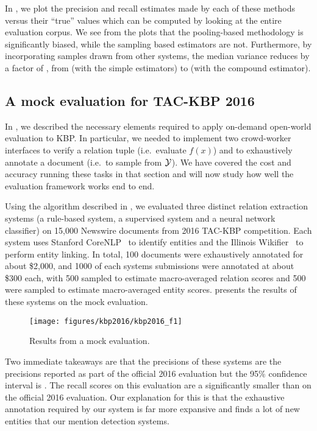 In , we plot the precision and recall estimates made by each of these methods versus their ``true'' values which can be computed by looking at the entire evaluation corpus.
We see from the plots that the pooling-based methodology is significantly biased, while the sampling based estimators are not.
Furthermore, by incorporating samples drawn from other systems, the median variance reduces by a factor of , from  (with the simple estimators) to  (with the compound estimator).

\subsection{A mock evaluation for TAC-KBP 2016}
In , we described the necessary elements required to apply on-demand open-world evaluation to KBP.
In particular, we needed to implement two crowd-worker interfaces to verify a relation tuple (i.e.\ evaluate $f(x)$) and to exhaustively annotate a document (i.e.\ to sample from $\mathcal{Y}$).
We have covered the cost and accuracy running these tasks in that section and will now study how well the evaluation framework works end to end. 

Using the algorithm described in , we evaluated three distinct relation extraction systems (a rule-based system, a supervised system and a neural network classifier) on 15,000 Newswire documents from 2016 TAC-KBP competition.
Each system uses Stanford CoreNLP~\citep{} to identify entities and the Illinois Wikifier~\citep{} to perform entity linking. 
In total, 100 documents were exhaustively annotated for about \$2,000, and 1000 of each systems submissions were annotated at about \$300 each, with 500 sampled to estimate macro-averaged relation scores and 500 were sampled to estimate macro-averaged entity scores.
 presents the results of these systems on the mock evaluation.

\begin{figure}[t]
  \centering
  \texttt{[image: figures/kbp2016/kbp2016\_f1]}
  \caption{\label{fig:evaluation-results} Results from a mock evaluation.}
\end{figure}

%  

Two immediate takeaways are that the precisions of these systems are  the precisions reported as part of the official 2016 evaluation but the 95\% confidence interval is .
The recall scores on this evaluation are a significantly smaller than on the official 2016 evaluation.
Our explanation for this is that the exhaustive annotation required by our system is far more expansive and finds a lot of new entities that our mention detection systems. 
